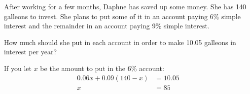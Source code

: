 \documentclass[letterpaper, landscape]{exam}
\begin{document}
\begin{questions}


    \ifprintanswers{}
      \newpage
    \fi

    \question[15]
    After working for a few months, Daphne has saved up some money. She has 140 galleons to
    invest. She plans to put some of it in an account paying 6\% simple interest and the remainder
    in an account paying 9\% simple interest. 
    
    How much should she put in each account in order to make 10.05 galleons in interest per year?

    \begin{solution}
      If you let $x$ be the amount to put in the 6\% account:
      \begin{align*}
        0.06x + 0.09( 140 - x ) & = 10.05 \\
        x                       & = \boxed{ 85 } \\
      \end{align*}
    \end{solution}


\end{questions}
\end{document}

